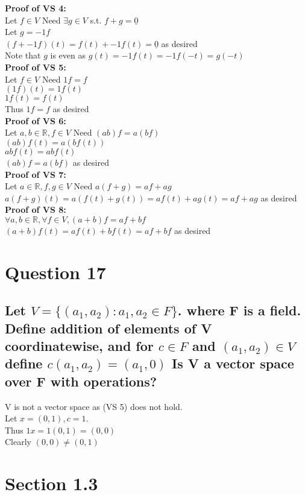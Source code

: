 \documentclass{article}
\begin{document}
\textbf{Proof of VS 4:}\\
Let $f \in V$ Need $\exists g \in V$ s.t. $f+g = \underline{0}$\\
Let $g = -1f$\\
$(f+ -1f)(t) = f(t) + -1f(t) = \underline{0}$ as desired\\
Note that $g$ is even as $g(t) = -1f(t) = -1f(-t) = g(-t)$\\
\textbf{Proof of VS 5:}\\
Let $f \in V$ Need $1f = f$\\
$(1f)(t) = 1f(t)$\\
$1f(t) = f(t)$ \\
Thus $1f = f$ as desired\\
\textbf{Proof of VS 6:}\\
Let $a,b \in \mathds{R}, f \in V$ Need $(ab)f = a(bf)$\\
$(ab)f(t) = a(bf(t))$\\
$abf(t) = abf(t)$\\
$(ab)f = a(bf)$ as desired\\
\textbf{Proof of VS 7:}\\
Let $a \in \mathds{R}, f,g \in V$ Need $a(f+g) = af + ag$\\
$a(f+g)(t) = a(f(t) + g(t)) = af(t) + ag(t) = af +ag$ as desired\\
\textbf{Proof of VS 8:}\\
$\forall a,b \in \mathds{R}, \forall f \in V, (a+b)f = af + bf$\\
$(a+b)f(t) = af(t) + bf(t) = af +bf$ as desired\\

\section*{Question 17}
\subsection*{Let $V = \{(a_1,a_2): a_1, a_2 \in F\}$.  where F is a field. Define addition of elements of V coordinatewise, and for $c \in F$ and $(a_1,a_2) \in V$ define $c(a_1,a_2) = (a_1,0)$ Is V a vector space over F with operations?}
V is not a vector space as (VS 5) does not hold.\\
Let $x = (0,1), c = 1$.\\
Thus $1x = 1(0,1) = (0,0)$\\
Clearly $(0,0) \neq (0,1)$

\section*{Section 1.3}
\end{document}
